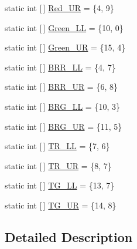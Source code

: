 \begin{DoxyCompactItemize}
\item 
static int \mbox{[}$\,$\mbox{]} \hyperlink{classca_1_1mcgill_1_1ecse211_1_1project_1_1_game_parameters_a81ddd789119962c32fe6d7f9cce4f240}{Red\+\_\+\+UR} = \{4, 9\}
\item 
static int \mbox{[}$\,$\mbox{]} \hyperlink{classca_1_1mcgill_1_1ecse211_1_1project_1_1_game_parameters_a24e38b735e194403bf2b9877241969c1}{Green\+\_\+\+LL} = \{10, 0\}
\item 
static int \mbox{[}$\,$\mbox{]} \hyperlink{classca_1_1mcgill_1_1ecse211_1_1project_1_1_game_parameters_aedb13ca3822f3581bdffd464891b1494}{Green\+\_\+\+UR} = \{15, 4\}
\item 
static int \mbox{[}$\,$\mbox{]} \hyperlink{classca_1_1mcgill_1_1ecse211_1_1project_1_1_game_parameters_a8695da7f04954ea1513082740fd2d57f}{B\+R\+R\+\_\+\+LL} = \{4, 7\}
\item 
static int \mbox{[}$\,$\mbox{]} \hyperlink{classca_1_1mcgill_1_1ecse211_1_1project_1_1_game_parameters_a720d0ae20fc2466e7b77fda14bf374f3}{B\+R\+R\+\_\+\+UR} = \{6, 8\}
\item 
static int \mbox{[}$\,$\mbox{]} \hyperlink{classca_1_1mcgill_1_1ecse211_1_1project_1_1_game_parameters_ae6824f16adf03173062767f99d46b6e0}{B\+R\+G\+\_\+\+LL} = \{10, 3\}
\item 
static int \mbox{[}$\,$\mbox{]} \hyperlink{classca_1_1mcgill_1_1ecse211_1_1project_1_1_game_parameters_a644c339e7b0f11c5780f9c7de34e1e07}{B\+R\+G\+\_\+\+UR} = \{11, 5\}
\item 
static int \mbox{[}$\,$\mbox{]} \hyperlink{classca_1_1mcgill_1_1ecse211_1_1project_1_1_game_parameters_ac642730053a35524ce70866289ca10b9}{T\+R\+\_\+\+LL} = \{7, 6\}
\item 
static int \mbox{[}$\,$\mbox{]} \hyperlink{classca_1_1mcgill_1_1ecse211_1_1project_1_1_game_parameters_a45c465e9f0b53a4e752a398036be13f5}{T\+R\+\_\+\+UR} = \{8, 7\}
\item 
static int \mbox{[}$\,$\mbox{]} \hyperlink{classca_1_1mcgill_1_1ecse211_1_1project_1_1_game_parameters_a0fefeecefd65deabea205bd9d628bf76}{T\+G\+\_\+\+LL} = \{13, 7\}
\item 
static int \mbox{[}$\,$\mbox{]} \hyperlink{classca_1_1mcgill_1_1ecse211_1_1project_1_1_game_parameters_aa8220987d04f322d9480db7cc073ffd2}{T\+G\+\_\+\+UR} = \{14, 8\}
\end{DoxyCompactItemize}


\subsection{Detailed Description}


